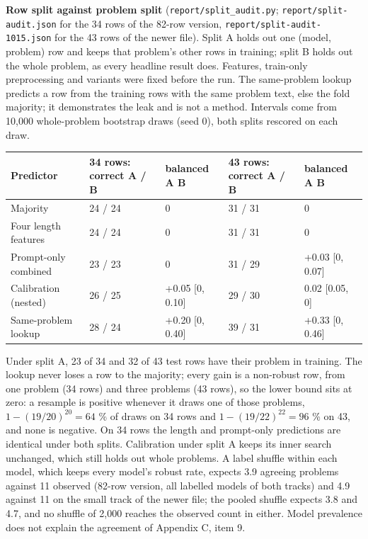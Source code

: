 \documentclass{article}
\begin{document}
\textbf{Row split against problem split} (\texttt{report/split\_audit.py}; \texttt{report/split-audit.json} for the 34
rows of the 82-row version, \texttt{report/split-audit-1015.json} for the 43 rows of the newer file). Split A holds out one
(model, problem) row and keeps that problem's other rows in training; split B holds out the whole
problem, as every headline result does. Features, train-only preprocessing and variants were fixed
before the run. The same-problem lookup predicts a row from the training rows with the same problem
text, else the fold majority; it demonstrates the leak and is not a method. Intervals come from
10,000 whole-problem bootstrap draws (seed 0), both splits rescored on each draw.

\begin{center}
\small
\begin{tabular}{@{}p{2.8cm}p{1.9cm}p{1.9cm}p{2.2cm}p{2.4cm}@{}}
\toprule
Predictor & 34 rows: correct A / B & balanced A \textminus{} B & 43 rows: correct A / B & balanced A \textminus{} B \\
\midrule
Majority & 24 / 24 & 0 & 31 / 31 & 0 \\
Four length features & 24 / 24 & 0 & 31 / 31 & 0 \\
Prompt-only combined & 23 / 23 & 0 & 31 / 29 & +0.03 {[}0, 0.07{]} \\
Calibration (nested) & 26 / 25 & +0.05 {[}0, 0.10{]} & 29 / 30 & \textminus{}0.02 {[}\textminus{}0.05, 0{]} \\
Same-problem lookup & 28 / 24 & +0.20 {[}0, 0.40{]} & 39 / 31 & +0.33 {[}0, 0.46{]} \\
\bottomrule
\end{tabular}
\end{center}

Under split A, 23 of 34 and 32 of 43 test rows have their problem in training. The lookup never
loses a row to the majority; every gain is a non-robust row, from one problem (34 rows) and three
problems (43 rows), so the lower bound sits at zero: a resample is positive whenever it draws one of those
problems, $1 - (19/20)^{20} = 64$ \% of draws on 34 rows and $1 - (19/22)^{22} = 96$ \% on 43, and none is negative. On 34 rows the length and prompt-only predictions are identical under both splits.
Calibration under split A keeps its inner search unchanged, which still holds out whole problems.
A label shuffle within each model, which keeps every model's robust rate, expects 3.9 agreeing
problems against 11 observed (82-row version, all labelled models of both tracks) and 4.9 against 11 on the small
track of the newer file; the pooled shuffle expects 3.8 and 4.7, and no shuffle of 2,000 reaches
the observed count in either. Model prevalence does not explain the agreement of Appendix C, item 9.
\end{document}
